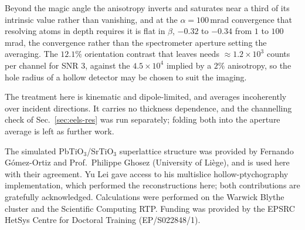 \documentclass[aps,prb,twocolumn,superscriptaddress,floatfix,nofootinbib]{revtex4-2}
\begin{document}
Beyond the magic angle the anisotropy inverts and saturates near a third of its intrinsic value rather than vanishing, and at the $\alpha=100$\,mrad convergence that resolving atoms in depth requires it is flat in $\beta$, $-0.32$ to $-0.34$ from $1$ to $100$\,mrad, the convergence rather than the spectrometer aperture setting the averaging. The $12.1\%$ orientation contrast that leaves needs $\approx1.2\times10^{3}$ counts per channel for SNR $3$, against the $4.5\times10^{4}$ implied by a $2\%$ anisotropy, so the hole radius of a hollow detector may be chosen to suit the imaging.

The treatment here is kinematic and dipole-limited, and averages incoherently over incident directions. It carries no thickness dependence, and the channelling check of Sec.~\ref{sec:eels-res} was run separately; folding both into the aperture average is left as further work.

\begin{acknowledgments}
The simulated PbTiO$_3$/SrTiO$_3$ superlattice structure was provided by Fernando G\'omez-Ortiz and Prof.\ Philippe Ghosez (University of Li\`ege), and is used here with their agreement. Yu Lei gave access to his multislice hollow-ptychography implementation, which performed the reconstructions here; both contributions are gratefully acknowledged. Calculations were performed on the Warwick Blythe cluster and the Scientific Computing RTP. Funding was provided by the EPSRC HetSys Centre for Doctoral Training (EP/S022848/1).
\end{acknowledgments}



\end{document}
